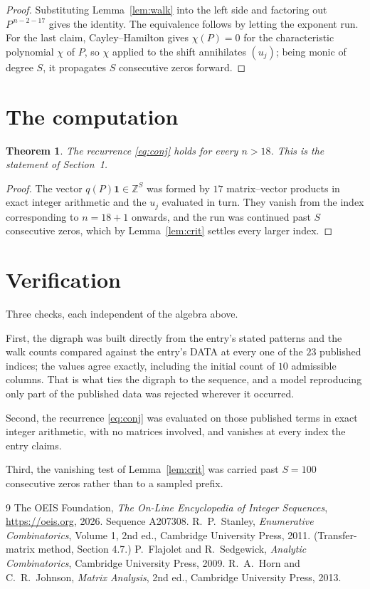 \documentclass[11pt,a4paper]{article}
\theoremstyle{plain}
\newtheorem{theorem}{Theorem}
\theoremstyle{definition}
\begin{document}
\begin{proof}
Substituting Lemma~\ref{lem:walk} into the left side and factoring out
$P^{\,n-2-17}$ gives the identity. The equivalence follows by letting the exponent
run. For the last claim, Cayley--Hamilton gives $\chi(P)=0$ for the characteristic
polynomial $\chi$ of $P$, so $\chi$ applied to the shift annihilates $(u_j)$; being monic of
degree $S$, it propagates $S$ consecutive zeros forward.
\end{proof}

\section{The computation}

\begin{theorem}
The recurrence \eqref{eq:conj} holds for every $n>18$. This is the statement of
Section~1.
\end{theorem}

\begin{proof}
The vector $q(P)\mathbf{1}\in\mathbb{Z}^{S}$ was formed by $17$ matrix--vector
products in exact integer arithmetic and the $u_j$ evaluated in turn. They vanish from the
index corresponding to $n=18+1$ onwards, and the run was continued past $S$ consecutive
zeros, which by Lemma~\ref{lem:crit} settles every larger index.
\end{proof}

\section{Verification}

Three checks, each independent of the algebra above.

First, the digraph was built directly from the entry's stated patterns and the walk counts
compared against the entry's DATA at every one of the $23$ published indices; the
values agree exactly, including the initial count of $10$ admissible columns. That is
what ties the digraph to the sequence, and a model reproducing only part of the published
data was rejected wherever it occurred.

Second, the recurrence \eqref{eq:conj} was evaluated on those published terms in exact
integer arithmetic, with no matrices involved, and vanishes at every index the entry claims.

Third, the vanishing test of Lemma~\ref{lem:crit} was carried past $S=100$ consecutive
zeros rather than to a sampled prefix.

\begin{thebibliography}{9}
 The OEIS Foundation, \emph{The On-Line Encyclopedia of Integer
Sequences}, \url{https://oeis.org}, 2026. Sequence A207308.
 R.~P.~Stanley, \emph{Enumerative Combinatorics}, Volume 1, 2nd ed.,
Cambridge University Press, 2011. (Transfer-matrix method, Section 4.7.)
 P.~Flajolet and R.~Sedgewick, \emph{Analytic Combinatorics}, Cambridge
University Press, 2009.
 R.~A.~Horn and C.~R.~Johnson, \emph{Matrix Analysis}, 2nd ed., Cambridge
University Press, 2013.
\end{thebibliography}
\end{document}
